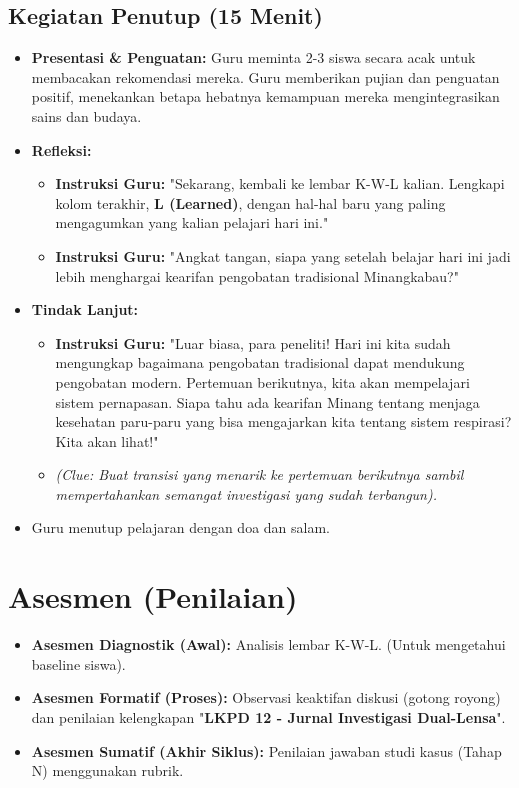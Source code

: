 \documentclass[a4paper,12pt]{article}
\begin{document}
\subsection{Kegiatan Penutup (15 Menit)}
\begin{itemize}
\item \textbf{Presentasi \& Penguatan:} Guru meminta 2-3 siswa secara acak untuk membacakan rekomendasi mereka. Guru memberikan pujian dan penguatan positif, menekankan betapa hebatnya kemampuan mereka mengintegrasikan sains dan budaya.
\item \textbf{Refleksi:}
    \begin{itemize}
    \item \textbf{Instruksi Guru:} "Sekarang, kembali ke lembar K-W-L kalian. Lengkapi kolom terakhir, \textbf{L (Learned)}, dengan hal-hal baru yang paling mengagumkan yang kalian pelajari hari ini."
    \item \textbf{Instruksi Guru:} "Angkat tangan, siapa yang setelah belajar hari ini jadi lebih menghargai kearifan pengobatan tradisional Minangkabau?"
    \end{itemize}
\item \textbf{Tindak Lanjut:}
    \begin{itemize}
    \item \textbf{Instruksi Guru:} "Luar biasa, para peneliti! Hari ini kita sudah mengungkap bagaimana pengobatan tradisional dapat mendukung pengobatan modern. Pertemuan berikutnya, kita akan mempelajari sistem pernapasan. Siapa tahu ada kearifan Minang tentang menjaga kesehatan paru-paru yang bisa mengajarkan kita tentang sistem respirasi? Kita akan lihat!"
    \item \textit{(Clue: Buat transisi yang menarik ke pertemuan berikutnya sambil mempertahankan semangat investigasi yang sudah terbangun).}
    \end{itemize}
\item Guru menutup pelajaran dengan doa dan salam.
\end{itemize}

\section{Asesmen (Penilaian)}

\begin{itemize}
\item \textbf{Asesmen Diagnostik (Awal):} Analisis lembar K-W-L. (Untuk mengetahui baseline siswa).
\item \textbf{Asesmen Formatif (Proses):} Observasi keaktifan diskusi (gotong royong) dan penilaian kelengkapan "\textbf{LKPD 12 - Jurnal Investigasi Dual-Lensa}".
\item \textbf{Asesmen Sumatif (Akhir Siklus):} Penilaian jawaban studi kasus (Tahap N) menggunakan rubrik.
\end{itemize}
\end{document}
